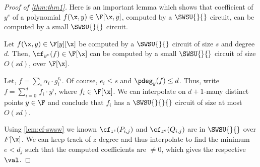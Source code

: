 \begin{proof}[Proof of \autoref{thm:thm1}]
Here is an important lemma which shows that coefficient of $y^e$ of a polynomial $f(\x,y) \in \F[\x,y]$, computed by a $\SWSU{}{}$ circuit, can be computed by a small $\SWSU{}{}$ circuit.

\begin{lemma}\label{lem:cf-swsw}
Let $f(\x,y) \in \F[y][\x]$ be computed by a $\SWSU{}{}$ circuit of size $s$ and degree $d$. Then, $\cf_{y^e}(f) \in \F[\x]$ can be computed by a small $\SWSU{}{}$ circuit of size $O(sd)$, over $\F[\x]$.
\end{lemma}
\begin{proof-sketch}
    Let, $f= \sum_{i} \alpha_i \cdot g_i^{e_i}$. Of course, $e_i \le s$ and $\pdeg_{y}(f) \le d$. Thus, write $f=\sum_{i=0}^{d}\,f_i\cdot y^i$, where $f_i \in \F[\x]$. We can interpolate on $d+1$-many distinct points $y\in \F$ and conclude that $f_i$ has a $\SWSU{}{}{}$ circuit of size at most $O(sd)$. 
\end{proof-sketch}

\noindent Using \autoref{lem:cf-swsw} we known $\cf_{z^e}(P_{i,j})$ and $\cf_{z^e}(Q_{i,j})$ are in $\SWSU{}{}$ over $F[\x]$. We can keep track of $z$ degree and thus interpolate to find the minimum $e < d_j$ such that the computed coefficients are $\ne 0$, which gives the respective $\val$.

\smallskip


\end{proof}

